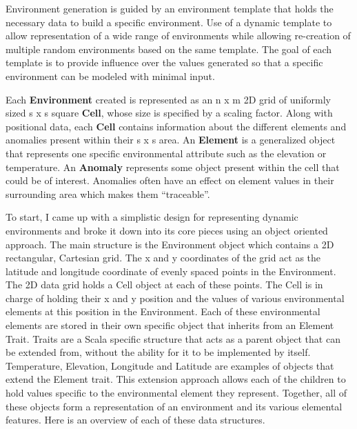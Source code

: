 Environment generation is guided by an environment template that holds the necessary data to build a specific environment. 
Use of a dynamic template to allow representation of a wide range of environments while allowing re-creation of multiple random environments based on the same template.
The goal of each template is to provide influence over the values generated so that a specific environment can be modeled with minimal input.

Each \textbf{Environment} created is represented as an n x m 2D grid of uniformly sized s x s square \textbf{Cell}, whose size is specified by a scaling factor.
Along with positional data, each \textbf{Cell} contains information about the different elements and anomalies present within their s x s area.
An \textbf{Element} is a generalized object that represents one specific environmental attribute such as the elevation or temperature.
An \textbf{Anomaly} represents some object present within the cell that could be of interest.
Anomalies often have an effect on element values in their surrounding area which makes them “traceable”.


To start, I came up with a simplistic design for representing dynamic environments and broke it down into its core pieces using an object oriented approach.
The main structure is the Environment object which contains a 2D rectangular, Cartesian grid. The x and y coordinates of the grid act as the latitude and longitude coordinate of evenly spaced points in the Environment.
The 2D data grid holds a Cell object at each of these points.
The Cell is in charge of holding their x and y position and the values of various environmental elements at this position in the Environment.
Each of these environmental elements are stored in their own specific object that inherits from an Element Trait.
Traits are a Scala specific structure that acts as a parent object that can be extended from, without the ability for it to be implemented by itself.
Temperature, Elevation, Longitude and Latitude are examples of objects that extend the Element trait.
This extension approach allows each of the children to hold values specific to the environmental element they represent.
Together, all of these objects form a representation of an environment and its various elemental features.
Here is an overview of each of these data structures.

